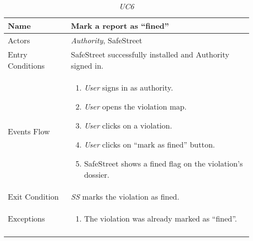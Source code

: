 \documentclass[../../../RASD.tex]{subfiles}
\begin{document}
    \begin{center}
        \begin{longtable}{| p{.35\linewidth} | p{.65\linewidth} |}
            \hline
            \textbf{Name} & \textbf{Mark a report as “fined”}\\ \hline
            Actors & \textit{Authority}, SafeStreet\\ \hline
            Entry Conditions & SafeStreet successfully installed and Authority signed in.\\ \hline
            Events Flow &
            \begin{enumerate}
                \item \textit{User} signs in as authority.
                \item \textit{User} opens the violation map.
                \item \textit{User} clicks on a violation.
                \item \textit{User} clicks on “mark as fined” button.
                \item SafeStreet shows a fined flag on the violation’s dossier.
            \end{enumerate}
            \\ \hline
            Exit Condition & \textit{SS} marks the violation as fined.\\ \hline
            Exceptions &
            \begin{enumerate}
                \item The violation was already marked as “fined”.
            \end{enumerate}
            \\
            \hline
            \caption[\textit{Use Case 6}]{\textit{UC6}}
        \end{longtable}
    \end{center}
    \newpage
\end{document}
